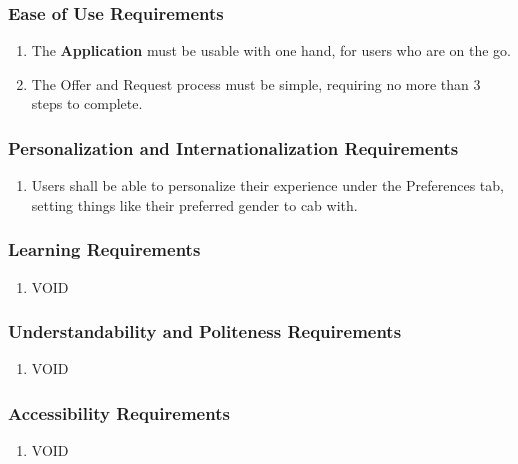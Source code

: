 \documentclass[english]{article}
\begin{document}
\subsubsection{Ease of Use Requirements}
\label{ssub:ease_of_use_requirements}
\begin{enumerate}[{EUR}1. ]
	\item The \textbf{Application} must be usable with one hand, for users who are on the go.
	\item The Offer and Request process must be simple, requiring no more than 3 steps to complete.
\end{enumerate}

\subsubsection{Personalization and Internationalization Requirements}
\label{ssub:personalization_and_internationalization_requirements}
\begin{enumerate}[{PIR}1. ]
	\item Users shall be able to personalize their experience under the Preferences tab, setting things like their preferred gender to cab with.
\end{enumerate}

\subsubsection{Learning Requirements}
\label{ssub:learning_requirements}
\begin{enumerate}[{LR}1. ]
	\item VOID
\end{enumerate}

\subsubsection{Understandability and Politeness Requirements}
\label{ssub:understandability_and_politeness_requirements}
\begin{enumerate}[{UPR}1. ]
	\item VOID
\end{enumerate}

\subsubsection{Accessibility Requirements}
\label{ssub:accessibility_requirements}
\begin{enumerate}[{ACR}1. ]
	\item VOID
\end{enumerate}
\end{document}
